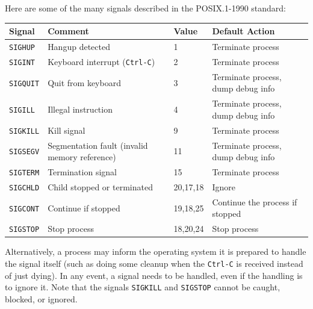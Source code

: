 Here are some of the many signals described in the POSIX.1-1990 standard:

\begin{center}
	\begin{tabular}{l|l|l|l}
		\textbf{Signal}  & \textbf{Comment}                              & \textbf{Value} & \textbf{Default Action}            \\ \hline
		\texttt{SIGHUP}  & Hangup detected                               & 1              & Terminate process                  \\
		\texttt{SIGINT}  & Keyboard interrupt (\texttt{Ctrl-C})          & 2              & Terminate process                  \\
		\texttt{SIGQUIT} & Quit from keyboard                            & 3              & Terminate process, dump debug info \\
		\texttt{SIGILL}  & Illegal instruction                           & 4              & Terminate process, dump debug info \\
		\texttt{SIGKILL} & Kill signal                                   & 9              & Terminate process                  \\
		\texttt{SIGSEGV} & Segmentation fault (invalid memory reference) & 11             & Terminate process, dump debug info \\
		\texttt{SIGTERM} & Termination signal                            & 15             & Terminate process                  \\
		\texttt{SIGCHLD} & Child stopped or terminated                   & 20,17,18       & Ignore                             \\
		\texttt{SIGCONT} & Continue if stopped                           & 19,18,25       & Continue the process if stopped    \\
		\texttt{SIGSTOP} & Stop process                                  & 18,20,24       & Stop process                       \\
	\end{tabular}
\end{center}


Alternatively, a process may inform the operating system it is prepared to handle the signal itself (such as doing some cleanup when the \texttt{Ctrl-C} is received instead of just dying). In any event, a signal needs to be handled, even if the handling is to ignore it. Note that the signals \texttt{SIGKILL} and \texttt{SIGSTOP} cannot be caught, blocked, or ignored.

